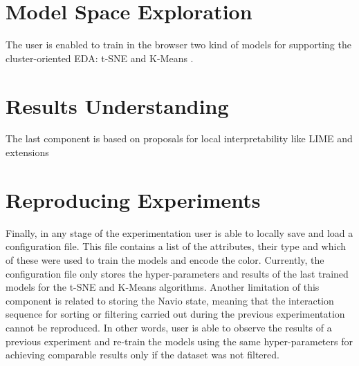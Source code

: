 \section{Model Space Exploration}
\label{model-space-exploration-section}

The user is enabled to train in the browser two kind of models for supporting the cluster-oriented EDA: t-SNE \cite{VanDerMaaten2008} and K-Means \cite{Lloyd1982LeastPCM}. 



\section{Results Understanding}
\label{results-understanding-section}

The last component is based on proposals for local interpretability like LIME \cite{Ribeiro2016} and extensions


\section{Reproducing Experiments}
\label{results-understanding-section}

Finally, in any stage of the experimentation user is able to locally save and load a configuration file. This file contains a list of the attributes, their type and which of these were used to train the models and encode the color. Currently, the configuration file only stores the hyper-parameters and results of the last trained models for the t-SNE and K-Means algorithms. Another limitation of this component is related to storing the Navio state, meaning that the interaction sequence for sorting or filtering carried out during the previous experimentation cannot be reproduced. In other words, user is able to observe the results of a previous experiment and re-train the models using the same hyper-parameters for achieving comparable results only if the dataset was not filtered. 